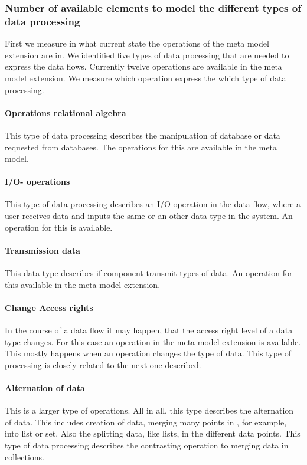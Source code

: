 \subsubsection{Number of available elements to model the different types of data processing}
First we measure in what current state the operations of the meta model extension are in. We identified five types of data processing that are needed to express the data flows. Currently twelve operations are available in the meta model extension. We measure which operation express the which type of data processing.
\paragraph{Operations relational algebra}
This type of data processing describes the manipulation of database or data requested from databases. The operations for this are available in the meta model. 
\paragraph{I/O- operations}
This type of data processing describes an I/O operation in the data flow, where a user receives data and inputs the same or an other data type in the system. An operation for this is available. 
\paragraph{Transmission data}
This data type describes if component transmit types of data. An operation for this available in the meta model extension. 
\paragraph{Change Access rights}
In the course of a data flow it may happen, that the access right level of a data type changes. For this case an operation in the meta model extension is available. This mostly happens when an operation changes the type of data. This type of processing is closely related to the next one described. 
\paragraph{Alternation of data}
This is a larger type of operations. All in all, this type describes the alternation of data. This includes
creation of data, merging many points in , for example, into list or set. Also the splitting data, like lists, in the different data points. This type of data processing describes the contrasting operation to merging data in collections. 
